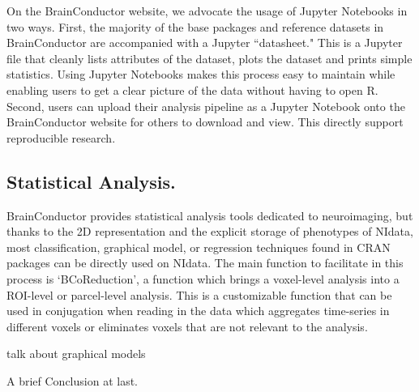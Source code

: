 \documentclass{nature}
\begin{document}
On the BrainConductor website, we advocate the usage of Jupyter Notebooks
in two ways. First, the majority of the base packages and reference datasets 
in BrainConductor are accompanied with a Jupyter ``datasheet." This is a 
Jupyter file that cleanly lists attributes of the dataset, plots the dataset
and prints simple statistics. Using Jupyter Notebooks makes this process easy
to maintain while enabling users to get a clear picture of the data without
having to open R. Second, users can upload their analysis pipeline as a Jupyter
Notebook onto the BrainConductor website for others to download and view. This
directly support reproducible research. 

\subsection{Statistical Analysis.}


BrainConductor provides statistical analysis tools dedicated to neuroimaging,
but thanks to the 2D representation and the explicit storage of
phenotypes of NIdata, most classification, graphical model, or regression techniques
found in CRAN packages can be directly used on NIdata. The main function to
facilitate in this process is `BCoReduction', a function which brings a voxel-level
analysis into a ROI-level or parcel-level analysis. This is a customizable function
that can be used in conjugation when reading in the data which aggregates time-series
in different voxels or eliminates voxels that are not relevant to the analysis.

{\color{red}talk about graphical models}


 
A brief Conclusion at last.


 
\end{document}
